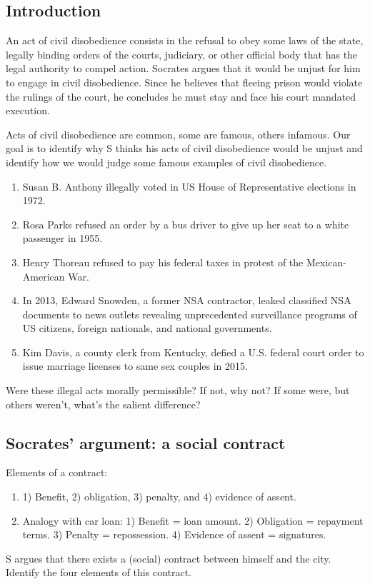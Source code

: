 \documentclass[oneside]{article}
\begin{document}
\subsection*{Introduction}

An act of civil disobedience consists in the refusal to obey some laws of the state, legally binding orders of the courts, judiciary, or other official body that has the  legal authority to compel action. Socrates argues that it would be unjust for him to engage in civil disobedience. Since he believes that fleeing prison would violate the rulings of the court, he concludes he must stay and face his court mandated execution.

Acts of civil disobedience are common, some are famous, others infamous. Our goal is to identify why S thinks his acts of civil disobedience would be unjust and identify how we would judge some famous examples of civil disobedience. 

\begin{enumerate}
\item Susan B. Anthony illegally voted in US House of Representative elections in 1972. 
\item Rosa Parks refused an order by a bus driver to give up her seat to a white passenger in 1955.
  \item Henry Thoreau refused to pay his federal taxes in protest of the Mexican-American War.
\item   In 2013, Edward Snowden, a former NSA contractor, leaked classified NSA documents to news outlets revealing unprecedented surveillance programs of US citizens, foreign nationals, and national governments.
\item Kim Davis, a county clerk from Kentucky, defied a U.S. federal court order to issue marriage licenses to same sex couples in 2015. 

\end{enumerate}
Were these illegal acts morally permissible? If not, why not? If some
 were, but others weren't, what's the salient difference?


\subsection*{Socrates' argument: a social contract}

Elements of a contract:

\begin{enumerate}
\item[ ] 1) Benefit, 2) obligation, 3) penalty, and 4) evidence of assent.
\item[ ]  Analogy with car loan:  1) Benefit = loan amount. 2) Obligation = repayment terms. 3) Penalty = repossession. 4) Evidence of assent = signatures.\end{enumerate}
S argues that there exists a (social) contract between himself and the city. Identify the four elements of this contract.
\end{document}

